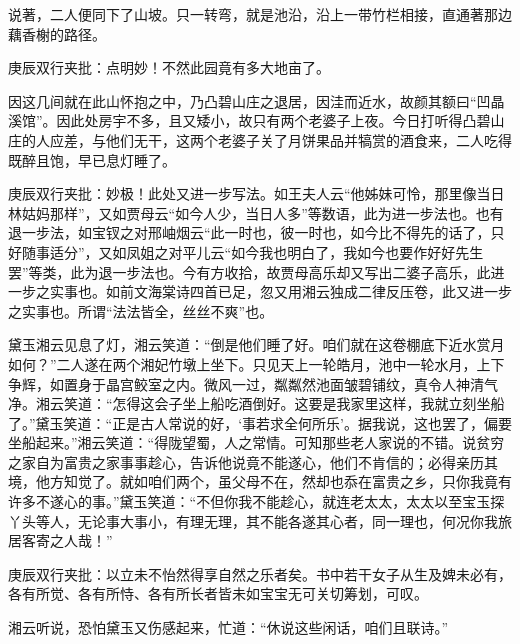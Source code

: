 \begin{parag}
    说著，二人便同下了山坡。只一转弯，就是池沿，沿上一带竹栏相接，直通著那边藕香榭的路径。\begin{note}庚辰双行夹批：点明妙！不然此园竟有多大地亩了。\end{note}因这几间就在此山怀抱之中，乃凸碧山庄之退居，因洼而近水，故颜其额曰“凹晶溪馆”。因此处房宇不多，且又矮小，故只有两个老婆子上夜。今日打听得凸碧山庄的人应差，与他们无干，这两个老婆子关了月饼果品并犒赏的酒食来，二人吃得既醉且饱，早已息灯睡了。\begin{note}庚辰双行夹批：妙极！此处又进一步写法。如王夫人云“他姊妹可怜，那里像当日林姑妈那样”，又如贾母云“如今人少，当日人多”等数语，此为进一步法也。也有退一步法，如宝钗之对邢岫烟云“此一时也，彼一时也，如今比不得先的话了，只好随事适分”，又如凤姐之对平儿云“如今我也明白了，我如今也要作好好先生罢”等类，此为退一步法也。今有方收拾，故贾母高乐却又写出二婆子高乐，此进一步之实事也。如前文海棠诗四首已足，忽又用湘云独成二律反压卷，此又进一步之实事也。所谓“法法皆全，丝丝不爽”也。\end{note}
\end{parag}


\begin{parag}
    黛玉湘云见息了灯，湘云笑道：“倒是他们睡了好。咱们就在这卷棚底下近水赏月如何？”二人遂在两个湘妃竹墩上坐下。只见天上一轮皓月，池中一轮水月，上下争辉，如置身于晶宫鲛室之内。微风一过，粼粼然池面皱碧铺纹，真令人神清气净。湘云笑道：“怎得这会子坐上船吃酒倒好。这要是我家里这样，我就立刻坐船了。”黛玉笑道：“正是古人常说的好，‘事若求全何所乐’。据我说，这也罢了，偏要坐船起来。”湘云笑道：“得陇望蜀，人之常情。可知那些老人家说的不错。说贫穷之家自为富贵之家事事趁心，告诉他说竟不能遂心，他们不肯信的；必得亲历其境，他方知觉了。就如咱们两个，虽父母不在，然却也忝在富贵之乡，只你我竟有许多不遂心的事。”黛玉笑道：“不但你我不能趁心，就连老太太，太太以至宝玉探丫头等人，无论事大事小，有理无理，其不能各遂其心者，同一理也，何况你我旅居客寄之人哉！”\begin{note}庚辰双行夹批：以立未不怡然得享自然之乐者矣。书中若干女子从生及婢未必有，各有所觉、各有所恃、各有所长者皆未如宝宝无可关切筹划，可叹。\end{note}湘云听说，恐怕黛玉又伤感起来，忙道：“休说这些闲话，咱们且联诗。”
\end{parag}


